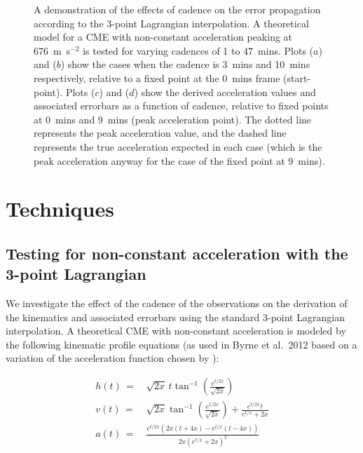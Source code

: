 \documentclass[structabstract]{aa}
\begin{document}
\begin{figure}[ht]
\caption{A demonstration of the effects of cadence on the error propagation according to the 3-point Lagrangian interpolation. A theoretical model for a CME with non-constant acceleration peaking at 676~m~s$^{-2}$ is tested for varying cadences of 1 to 47~mins. Plots ($a$) and ($b$) show the cases when the cadence is 3~mins and 10~mins respectively, relative to a fixed point at the 0~mins frame (start-point). Plots ($c$) and ($d$) show the derived acceleration values and associated errorbars as a function of cadence, relative to fixed points at 0~mins and 9~mins (peak acceleration point). The dotted line represents the peak acceleration value, and the dashed line represents the true acceleration expected in each case (which is the peak acceleration anyway for the case of the fixed point at 9~mins).}
\label{fig_cadence_4}
\end{figure}


\section{Techniques}

\subsection{Testing for non-constant acceleration with the 3-point Lagrangian}


We investigate the effect of the cadence of the observations on the derivation of the kinematics and associated errorbars using the standard 3-point Lagrangian interpolation. A theoretical CME with non-constant acceleration is modeled by the following kinematic profile equations (as used in Byrne et al.~2012 based on a variation of the acceleration function chosen by \citealt{2003ApJ...588L..53G}):

\begin{eqnarray}
h(t)\,=&\,\sqrt{2x}\,t\tan^{-1}\left(\frac{e^{t/2x}}{\sqrt{2x}}\right) \\
v(t)\,=&\,\sqrt{2x}\tan^{-1}\left(\frac{e^{t/2x}}{\sqrt{2x}}\right)+\frac{e^{t/2x}t}{e^{t/x}+2x} \\
a(t)\,=&\,\frac{e^{t/2x}\left(2x\left(t+4x\right)-e^{t/x}\left(t-4x\right)\right)}{2x\left(e^{t/x}+2x\right)^2}
\end{eqnarray}
\end{document}
